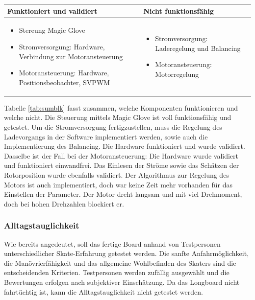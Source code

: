 \begin{center}
	\begin{tabular}{p{}|p{}}
		Funktioniert und validiert & Nicht funktionsfähig \\ \hline 
		\begin{itemize}
			\item Stereung Magic Glove
			\item Stromversorgung: Hardware, Verbindung zur Motoransteuerung
			\item Motoransteuerung: Hardware, Positionsbeobachter, SVPWM
		\end{itemize}
		&
		\begin{itemize}
			\item Stromversorgung: Laderegelung und Balancing
			\item Motoransteuerung: Motorregelung
		\end{itemize}
		\\ \hline
	\end{tabular} 
	\label{tab:sumblk}
\end{center}

Tabelle \ref{tab:sumblk} fasst zusammen, welche Komponenten funktionieren und welche nicht. Die Steuerung mittels Magic Glove ist voll funktionsfähig und getestet. Um die Stromversorgung fertigzustellen, muss die Regelung des Ladevorgangs in der Software implementiert werden, sowie auch die Implementierung des Balancing.
Die Hardware funktioniert und wurde validiert. Dasselbe ist der Fall bei der Motoransteuerung: Die Hardware wurde validiert und funktioniert einwandfrei. Das Einlesen der Ströme sowie das Schätzen der Rotorposition wurde ebenfalls validiert. Der Algorithmus zur Regelung des Motors ist auch implementiert, doch war keine Zeit mehr vorhanden für das Einstellen der Parameter. Der Motor dreht langsam und mit viel Drehmoment, doch bei hohen Drehzahlen blockiert er.

\subsubsection*{Alltagstauglichkeit} \label{ValidAlltag}
Wie bereits angedeutet, soll das fertige Board anhand von Testpersonen unterschiedlicher Skate-Erfahrung getestet werden. Die sanfte Anfahrmöglichkeit, die Manövrierfähigkeit und das allgemeine Wohlbefinden des Skaters sind die entscheidenden Kriterien. 
Testpersonen werden zufällig ausgewählt und die Bewertungen erfolgen nach subjektiver Einschätzung. 
Da das Longboard nicht fahrtüchtig ist, kann die Alltagstauglichkeit nicht getestet werden.

